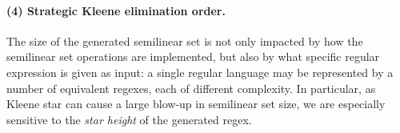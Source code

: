 

\paragraph{(4) Strategic Kleene elimination order.}  
The size of the generated semilinear set is not only impacted by how the
semilinear set operations are implemented, but also by what specific regular
expression is given as input: a single regular language may be represented by a
number of equivalent regexes, each of different complexity.
%
In particular, as Kleene star can cause a large blow-up in semilinear set size,
we are especially sensitive to the \emph{star height} of the generated regex.

